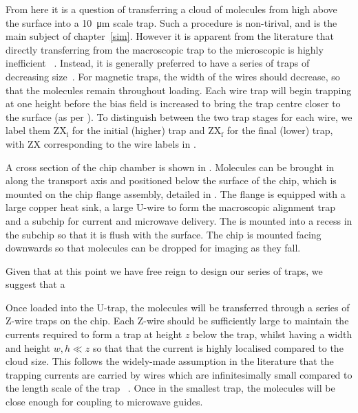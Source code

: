 From here it is a question of transferring a cloud of molecules from high above
the surface into a \SI{10}{\micro\meter} scale trap. Such a procedure is
non-tirival, and is the main subject of chapter~\ref{sim}. However it is
apparent from the literature that directly transferring from the macroscopic
trap to the microscopic is highly inefficient~ \cite{}.
%
Instead, it is generally preferred to have a series of traps of decreasing
size~\cite{Reichel1999}. For magnetic traps, the width of the wires should decrease, so that the
molecules remain  throughout
loading.
%
Each wire trap will begin trapping at one height before the bias field is
increased to bring the trap centre closer to the surface (as per
%
).  To distinguish between the two trap stages for
each wire, we label them $\mathrm{ZX_i}$ for the initial (higher) trap and
$\mathrm{ZX_f}$ for the final (lower) trap, with $\mathrm{ZX}$ corresponding to
the wire labels in .


A cross section of the chip chamber is shown in . Molecules can be
brought in along the transport axis and positioned below the surface of the
chip, which is mounted on the chip flange assembly, detailed in . The flange is equipped with a large copper heat sink, a
large U-wire to form the macroscopic alignment trap and a subchip for current
and microwave delivery. The  is mounted into a recess in the
subchip so that it is flush with the surface. The chip is mounted facing
downwards so that molecules can be dropped for imaging as they fall.

Given that at this point we have free reign to design our series of traps, we
suggest that a 

Once loaded into the U-trap, the molecules will be transferred through a series
of Z-wire traps on the chip. Each Z-wire should be sufficiently large to
maintain the currents required to form a trap at height $z$ below the trap,
whilst having a width and height  $w, h \ll z$ so that that the current is
highly localised compared to the cloud size.  This follows the widely-made
assumption in the literature that the trapping currents are carried by wires
which are infinitesimally small compared to the length scale of the trap
~\cite{2011Ac}. Once in the smallest trap, the molecules will be close enough
for coupling to microwave guides.

